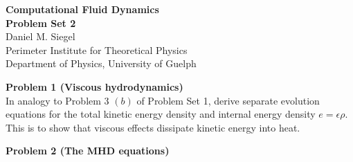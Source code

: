 \documentclass[letter,11pt]{article}
\begin{document}
\pagestyle{problem_set}


\phantom{.}
\begin{center}
{\Large\textbf{Computational Fluid Dynamics\\[0.4cm] Problem Set 2}} \\[0.7cm]
Daniel M. Siegel \\[0.1cm]
Perimeter Institute for Theoretical Physics\\
Department of Physics, University of Guelph
\end{center}

\vspace{1cm}

{\noindent\large\textbf{Problem 1 (Viscous hydrodynamics)}}\\[0.1cm]

\noindent In analogy to Problem 3 $(b)$ of Problem Set 1, derive separate evolution equations for the total kinetic energy density and internal energy density $e=\epsilon\rho$. This is to show that viscous effects dissipate kinetic energy into heat.

\vspace{1cm}

{\noindent\large\textbf{Problem 2 (The MHD equations)}}\\[-0.4cm]
\end{document}

